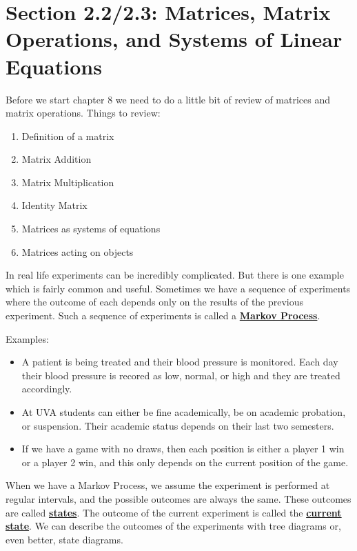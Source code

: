 \documentclass[14,fleqn]{article}
\newcommand{\defn}[1]{\textbf{\underline{#1}}}
\begin{document}
\section{Section 2.2/2.3: Matrices, Matrix Operations, and Systems of Linear Equations}

Before we start chapter 8 we need to do a little bit of review of matrices and matrix operations. Things to review:
\begin{enumerate}
	\item Definition of a matrix
	\item Matrix Addition
	\item Matrix Multiplication
	\item Identity Matrix
	\item Matrices as systems of equations
	\item Matrices acting on objects
\end{enumerate}

In real life experiments can be incredibly complicated. But there is one example which is fairly common and useful. Sometimes we have a sequence of experiments where the outcome of each depends only on the results of the previous experiment. Such a sequence of experiments is called a \defn{Markov Process}.

Examples:
\begin{itemize}
	\item A patient is being treated and their blood pressure is monitored. Each day their blood pressure is recored as low, normal, or high and they are treated accordingly.
	\item At UVA students can either be fine academically, be on academic probation, or suspension. Their academic status depends on their last two semesters.
	\item If we have a game with no draws, then each position is either a player 1 win or a player 2 win, and this only depends on the current position of the game.
\end{itemize}

When we have a Markov Process, we assume the experiment is performed at regular intervals, and the possible outcomes are always the same. These outcomes are called \defn{states}. The outcome of the current experiment is called the \defn{current state}. We can describe the outcomes of the experiments with tree diagrams or, even better, state diagrams.
\end{document}
